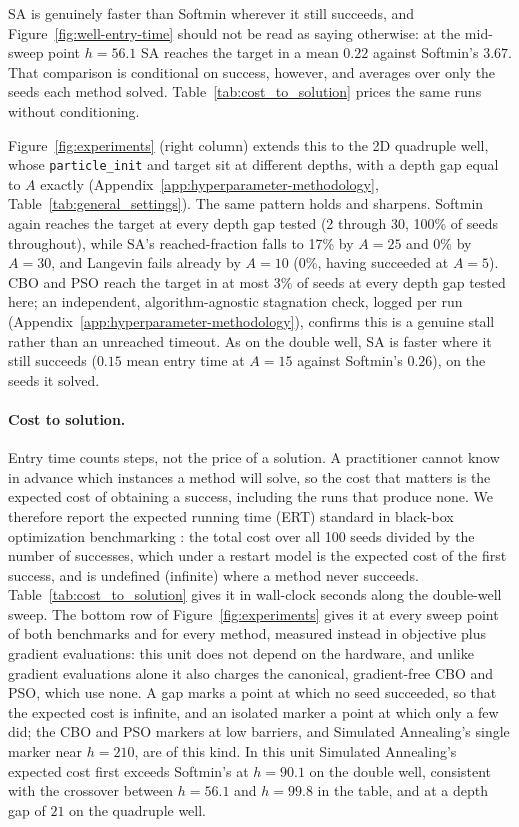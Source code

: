 \documentclass{article}
\theoremstyle{plain}
\theoremstyle{definition}
\theoremstyle{remark}
\begin{document}
SA is genuinely faster than Softmin wherever it still succeeds, and Figure~\ref{fig:well-entry-time} should not be read as saying otherwise: at the mid-sweep point $h=56.1$ SA reaches the target in a mean $0.22$ against Softmin's $3.67$. That comparison is conditional on success, however, and averages over only the seeds each method solved. Table~\ref{tab:cost_to_solution} prices the same runs without conditioning.

Figure~\ref{fig:experiments} (right column) extends this to the 2D quadruple well, whose \texttt{particle\_init} and target sit at different depths, with a depth gap equal to $A$ exactly (Appendix~\ref{app:hyperparameter-methodology}, Table~\ref{tab:general_settings}). The same pattern holds and sharpens. Softmin again reaches the target at every depth gap tested (2 through 30, 100\% of seeds throughout), while SA's reached-fraction falls to 17\% by $A=25$ and 0\% by $A=30$, and Langevin fails already by $A=10$ (0\%, having succeeded at $A=5$). CBO and PSO reach the target in at most 3\% of seeds at every depth gap tested here; an independent, algorithm-agnostic stagnation check, logged per run (Appendix~\ref{app:hyperparameter-methodology}), confirms this is a genuine stall rather than an unreached timeout. As on the double well, SA is faster where it still succeeds ($0.15$ mean entry time at $A=15$ against Softmin's $0.26$), on the seeds it solved.

\paragraph{Cost to solution.} Entry time counts steps, not the price of a solution. A practitioner cannot know in advance which instances a method will solve, so the cost that matters is the expected cost of obtaining a success, including the runs that produce none. We therefore report the expected running time (ERT) standard in black-box optimization benchmarking \cite{hansen2016coco}: the total cost over all 100 seeds divided by the number of successes, which under a restart model is the expected cost of the first success, and is undefined (infinite) where a method never succeeds. Table~\ref{tab:cost_to_solution} gives it in wall-clock seconds along the double-well sweep. The bottom row of Figure~\ref{fig:experiments} gives it at every sweep point of both benchmarks and for every method, measured instead in objective plus gradient evaluations: this unit does not depend on the hardware, and unlike gradient evaluations alone it also charges the canonical, gradient-free CBO and PSO, which use none. A gap marks a point at which no seed succeeded, so that the expected cost is infinite, and an isolated marker a point at which only a few did; the CBO and PSO markers at low barriers, and Simulated Annealing's single marker near $h=210$, are of this kind. In this unit Simulated Annealing's expected cost first exceeds Softmin's at $h=90.1$ on the double well, consistent with the crossover between $h=56.1$ and $h=99.8$ in the table, and at a depth gap of $21$ on the quadruple well.
\end{document}
